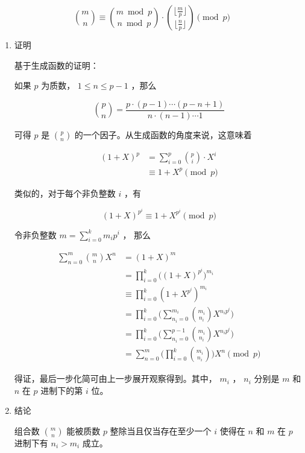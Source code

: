 \documentclass[11pt]{article}
\begin{document}
$$
\binom{m}{n} \equiv \binom{m \bmod p}{n \bmod p} \cdot \binom{\lfloor\frac{m}{p} \rfloor}{\lfloor \frac{n}{p} \rfloor} \pmod p
$$


\begin{enumerate}
\item 证明
\label{sec-3-3-2-1}

基于生成函数的证明：

如果 $p$ 为质数， $1\leq n \leq p-1$ ，那么

$$
\binom{p}{n} = \frac{p \cdot (p - 1) \cdots (p - n + 1)}{n \cdot (n - 1) \cdots 1}
$$

可得 $p$  是 $\binom{p}{n}$ 的一个因子。从生成函数的角度来说，这意味着

$$\begin{aligned}
(1 + X)^p &= \sum_{i=0}^p \binom{p}{i}\cdot X^i\\
&\equiv 1+X^p \pmod p
\end{aligned}$$

类似的，对于每个非负整数 $i$ ，有

$$
(1+X)^{p^i} \equiv 1 + X^{p^i} \pmod p
$$

令非负整数 $m=\sum_{i=0}^k m_i p^i$ ， 那么

$$\begin{aligned}
\sum_{n=0}^m \binom{m}{n}X^n &= (1 + X)^m \\
&=\prod_ {i=0}^k \Big ((1+X)^{p^i} \Big) ^{m_i}\\
&\equiv \prod_{i=0}^k(1+X^{p^i})^{m_i}\\
&=\prod_{i=0}^k\bigg ( \sum_{n_i=0}^{m_i} \binom{m_i}{n_i}X^{n_i p^i} \bigg)\\
&=\prod_{i=0}^k \bigg (\sum_{n_i=0}^{p-1} \binom{m_i}{n_i}X^{n_ip^i} \bigg)\\
&=\sum_{n=0}^m \bigg(\prod_{i=0}^k \binom{m_i}{n_i} \bigg) X^n \pmod p
\end{aligned}$$

得证，最后一步化简可由上一步展开观察得到。其中， $m_i$ ， $n_i$ 分别是 $m$ 和 $n$ 在 $p$ 进制下的第 $i$ 位。

\item 结论
\label{sec-3-3-2-2}

组合数 $\binom{m}{n}$ 能被质数 $p$ 整除当且仅当存在至少一个 $i$ 使得在 $n$ 和 $m$ 在 $p$ 进制下有 $n_i > m_i$ 成立。
\end{enumerate}
\end{document}
